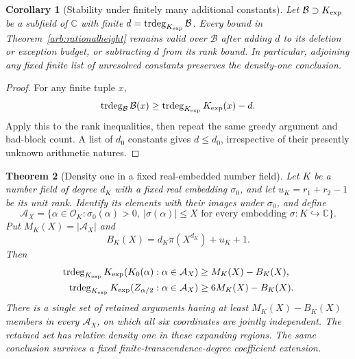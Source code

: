 \documentclass[11pt,a4paper]{article}
\newtheorem{theorem}{Theorem}[section]
\newtheorem{corollary}[theorem]{Corollary}
\theoremstyle{definition}
\theoremstyle{remark}
\numberwithin{equation}{section}
\begin{document}
\begin{corollary}[Stability under finitely many additional constants]
\label{arb:base-extension}
Let \(\mathcal B\supset K_{\mathrm{exp}}\) be a subfield of \(\mathbb C\)
with finite \(d=\operatorname{trdeg}_{K_{\mathrm{exp}}}\mathcal B\).
Every bound in Theorem~\ref{arb:rationalheight} remains valid over
\(\mathcal B\) after adding \(d\) to its deletion or exception
budget, or subtracting \(d\) from its rank bound.
In particular, adjoining any fixed finite list of unresolved
constants preserves the density-one conclusion.
\end{corollary}

\begin{proof}
For any finite tuple \(x\),
\[
 \operatorname{trdeg}_{\mathcal B}\mathcal B(x)
 \geq\operatorname{trdeg}_{K_{\mathrm{exp}}}K_{\mathrm{exp}}(x)-d.
\]
Apply this to the rank inequalities, then repeat the same greedy
argument and bad-block count.  A list of \(d_0\) constants gives
\(d\leq d_0\), irrespective of their presently unknown arithmetic
natures.
\end{proof}

\begin{theorem}[Density one in a fixed real-embedded number field]
\label{arb:numberfield}
Let \(K\) be a number field of degree \(d_K\) with a fixed real
embedding \(\sigma_0\), and let
\(u_K=r_1+r_2-1\) be its unit rank.  Identify its elements with
their images under \(\sigma_0\), and define
\[
 \mathcal A_X=\{\alpha\in\mathcal O_K:
       \sigma_0(\alpha)>0,\ |\sigma(\alpha)|\leq X
       \text{ for every embedding }\sigma:K\hookrightarrow\mathbb C\}.
\]
Put \(M_K(X)=|\mathcal A_X|\) and
\[
 B_K(X)=d_K\pi(X^{d_K})+u_K+1.
\]
Then
\begin{align*}
 \operatorname{trdeg}_{K_{\mathrm{exp}}}
  K_{\mathrm{exp}}(K_0(\alpha):\alpha\in\mathcal A_X)
    &\geq M_K(X)-B_K(X),\\
 \operatorname{trdeg}_{K_{\mathrm{exp}}}
  K_{\mathrm{exp}}(Z_{\alpha/2}:\alpha\in\mathcal A_X)
    &\geq 6M_K(X)-B_K(X).
\end{align*}
There is a single set of retained arguments having at least
\(M_K(X)-B_K(X)\) members in every \(\mathcal A_X\), on which
all six coordinates are jointly independent.  The retained set has
relative density one in these expanding regions.  The same conclusion
survives a fixed finite-transcendence-degree coefficient extension.
\end{theorem}
\end{document}
